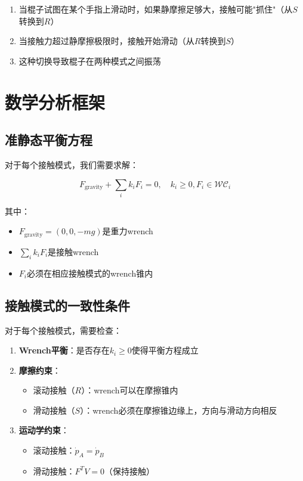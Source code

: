 \documentclass[12pt,a4paper]{article}
\begin{document}
\begin{enumerate}
    \item 当棍子试图在某个手指上滑动时，如果静摩擦足够大，接触可能"抓住"（从$S$转换到$R$）
    \item 当接触力超过静摩擦极限时，接触开始滑动（从$R$转换到$S$）
    \item 这种切换导致棍子在两种模式之间振荡
\end{enumerate}

\section{数学分析框架}

\subsection{准静态平衡方程}

对于每个接触模式，我们需要求解：

\begin{equation}
F_{\text{gravity}} + \sum_i k_i F_i = 0, \quad k_i \geq 0, F_i \in \mathcal{WC}_i
\end{equation}

其中：
\begin{itemize}
    \item $F_{\text{gravity}} = (0, 0, -mg)$是重力wrench
    \item $\sum_i k_i F_i$是接触wrench
    \item $F_i$必须在相应接触模式的wrench锥内
\end{itemize}

\subsection{接触模式的一致性条件}

对于每个接触模式，需要检查：

\begin{enumerate}
    \item \textbf{Wrench平衡}：是否存在$k_i \geq 0$使得平衡方程成立
    
    \item \textbf{摩擦约束}：
    \begin{itemize}
        \item 滚动接触（$R$）：wrench可以在摩擦锥内
        \item 滑动接触（$S$）：wrench必须在摩擦锥边缘上，方向与滑动方向相反
    \end{itemize}
    
    \item \textbf{运动学约束}：
    \begin{itemize}
        \item 滚动接触：$\dot{p}_A = \dot{p}_B$
        \item 滑动接触：$F^T V = 0$（保持接触）
    \end{itemize}
\end{enumerate}
\end{document}
